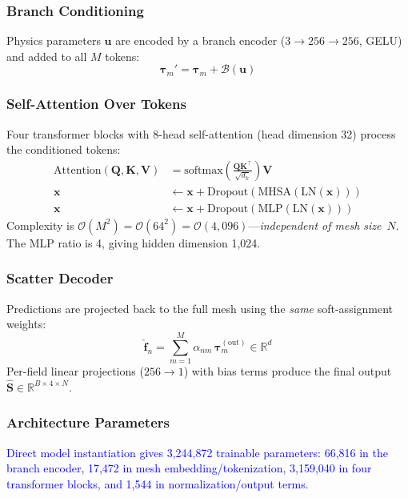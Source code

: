 \documentclass[journal]{IEEEtran}
\newcommand{\added}[1]{\textcolor{blue}{#1}}
\begin{document}
\subsubsection{Branch Conditioning}
Physics parameters $\bm{u}$ are encoded by a branch encoder ($3 \to 256 \to 256$, GELU) and added to all $M$ tokens:
\begin{equation}
\bm{\tau}_m' = \bm{\tau}_m + \mathcal{B}(\bm{u})
\label{eq:branch_cond}
\end{equation}

\subsubsection{Self-Attention Over Tokens}
Four transformer blocks with 8-head self-attention (head dimension 32) process the conditioned tokens:
\begin{align}
\text{Attention}(\bm{Q},\bm{K},\bm{V}) &= \text{softmax}\!\left(\frac{\bm{Q}\bm{K}^\top}{\sqrt{d_k}}\right)\bm{V} \label{eq:attn} \\
\bm{x} &\leftarrow \bm{x} + \text{Dropout}(\text{MHSA}(\text{LN}(\bm{x}))) \label{eq:res_attn} \\
\bm{x} &\leftarrow \bm{x} + \text{Dropout}(\text{MLP}(\text{LN}(\bm{x}))) \label{eq:res_mlp}
\end{align}
Complexity is $\mathcal{O}(M^2) = \mathcal{O}(64^2) = \mathcal{O}(4{,}096)$---\emph{independent of mesh size}~$N$. The MLP ratio is 4, giving hidden dimension 1,024.

\subsubsection{Scatter Decoder}
Predictions are projected back to the full mesh using the \emph{same} soft-assignment weights:
\begin{equation}
\hat{\bm{f}}_n = \sum_{m=1}^{M} \alpha_{nm}\,\bm{\tau}_m^{(\text{out})} \in \mathbb{R}^{d}
\label{eq:scatter}
\end{equation}
Per-field linear projections ($256 \to 1$) with bias terms produce the final output $\hat{\bm{S}} \in \mathbb{R}^{B \times 4 \times N}$.

\subsubsection{Architecture Parameters}
 \added{Direct model instantiation gives 3,244,872 trainable parameters: 66,816 in the branch encoder, 17,472 in mesh embedding/tokenization, 3,159,040 in four transformer blocks, and 1,544 in normalization/output terms.}
\end{document}
